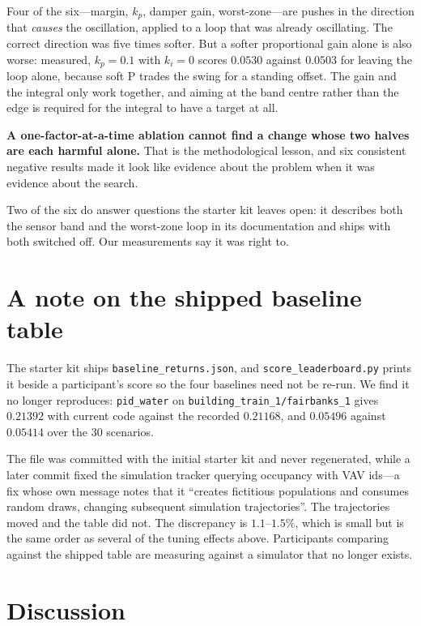 \documentclass[10pt]{article}
\begin{document}
Four of the six---margin, $k_p$, damper gain, worst-zone---are pushes in the
direction that \emph{causes} the oscillation, applied to a loop that was
already oscillating. The correct direction was five times softer. But a softer
proportional gain alone is also worse: measured, $k_p=0.1$ with $k_i=0$ scores
$0.0530$ against $0.0503$ for leaving the loop alone, because soft P trades
the swing for a standing offset. The gain and the integral only work together,
and aiming at the band centre rather than the edge is required for the
integral to have a target at all.

\textbf{A one-factor-at-a-time ablation cannot find a change whose two halves
are each harmful alone.} That is the methodological lesson, and six consistent
negative results made it look like evidence about the problem when it was
evidence about the search.

Two of the six do answer questions the starter kit leaves open: it describes
both the sensor band and the worst-zone loop in its documentation and ships
with both switched off. Our measurements say it was right to.

\section{A note on the shipped baseline table}

The starter kit ships \texttt{baseline\_returns.json}, and
\texttt{score\_leaderboard.py} prints it beside a participant's score so the
four baselines need not be re-run. We find it no longer reproduces:
\texttt{pid\_water} on \texttt{building\_train\_1/fairbanks\_1} gives
$0.21392$ with current code against the recorded $0.21168$, and $0.05496$
against $0.05414$ over the 30 scenarios.

The file was committed with the initial starter kit and never regenerated,
while a later commit fixed the simulation tracker querying occupancy with VAV
ids---a fix whose own message notes that it ``creates fictitious populations
and consumes random draws, changing subsequent simulation trajectories''. The
trajectories moved and the table did not. The discrepancy is $1.1$--$1.5\%$,
which is small but is the same order as several of the tuning effects above.
Participants comparing against the shipped table are measuring against a
simulator that no longer exists.

\section{Discussion}
\end{document}
